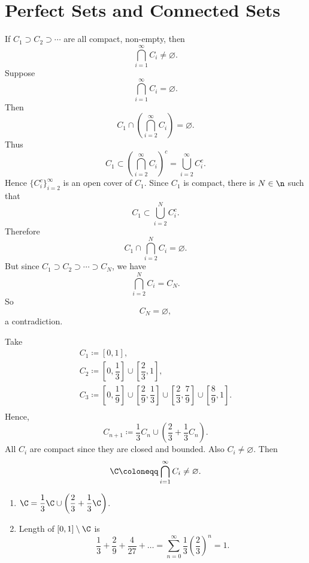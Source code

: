 
\section{Perfect Sets and Connected Sets}


\begin{theorem}{
    If $C_1\supset C_2\supset\cdots$ are all compact, non-empty, then
    \[
        \bigcap_{i=1}^\infty C_i\neq\varnothing.
    \]
}
    Suppose
    \[
        \bigcap_{i=1}^\infty C_i = \varnothing.
    \]
    Then
    \[
        C_1\cap\left(\bigcap_{i=2}^\infty C_i\right)=\varnothing.
    \]
    Thus
    \[
        C_1\subset\left(\bigcap_{i=2}^\infty C_i\right)^c=\bigcup_{i=2}^\infty C_i^c.
    \]
    Hence $\{C_i^c\}_{i=2}^\infty$ is an open cover of $C_1$.
    Since $C_1$ is compact, there is $N\in\n$ such that
    \[
        C_1\subset\bigcup_{i=2}^N C_i^c.
    \]
    Therefore
    \[
        C_1\cap\bigcap_{i=2}^N C_i=\varnothing.
    \]
    But since $C_1\supset C_2\supset\cdots\supset C_N$, we have
    \[
        \bigcap_{i=2}^N C_i = C_N.
    \]
    So
    \[
        C_N=\varnothing,
    \]
    a contradiction.
\end{theorem}

\begin{definition}
    Take
    \begin{gather*}
        C_1 \coloneqq [0,1],\\
        C_2 \coloneqq \left[0, \dfrac{1}{3}\right]\cup \left[\dfrac{2}{3}, 1\right],\\
        C_3 \coloneqq \left[0,\dfrac{1}{9}\right]\cup\left[\dfrac{2}{9},\dfrac{1}{3}\right]\cup\left[\dfrac{2}{3},\dfrac{7}{9}\right]\cup\left[\dfrac{8}{9},1\right].\\
    \end{gather*}
    Hence,
    \[
        C_{n+1} \coloneqq \dfrac{1}{3}C_n\cup\left(\dfrac{2}{3} + \dfrac{1}{3}C_n\right).
    \]
    All $C_i$ are compact since they are closed and bounded.
    Also $C_i\neq\varnothing$.
    Then
    \[
        \C \coloneqq \bigcap_{i=1}^\infty C_i\neq\varnothing.
    \]
\end{definition}

\begin{remark}
    \begin{enumerate}
        \item $\C = \dfrac{1}{3}\C\cup\left(\dfrac{2}{3} + \dfrac{1}{3}\C\right)$.
        \item Length of $[0,1]\setminus \C$ is
        \[
            \dfrac{1}{3} + \dfrac{2}{9} + \dfrac{4}{27} + \ldots = \sum_{n=0}^\infty \dfrac{1}{3}\left(\dfrac{2}{3}\right)^n = 1.
        \]
    \end{enumerate}
\end{remark}

